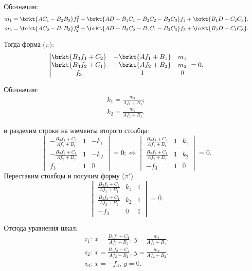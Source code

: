 Обозначим:
\begin{eqnarray}
m_1 = \brkt{A C_1 - B_2 B_3} f_1^2 
	+ \brkt{A D + B_1 C_1 - B_2 C_2 - B_3 C_3} f_1 
	+ \brkt{B_1 D - C_2 C_3}.\\
m_2 = \brkt{A C_2 - B_1 B_3}f_2^2 
	+ \brkt{A D + B_2 C_2 - B_1 C_1 - B_3 C_3} f_2
	+ \brkt{B_2 D - C_1 C_3}.
\end{eqnarray}

Тогда форма ($\pi$):
\begin{equation}
	\begin{vmatrix}
		\brkt{B_3 f_1 + C_2} &
		- \brkt{Af_1 + B_1} &
		m_1 \\
		\brkt{B_3 f_2 + C_1} &
		-\brkt{A f_2 + B_2} &
		m_2 \\
		f_3 & 1 & 0
	\end{vmatrix} = 0.
\end{equation}

Обозначим:
\begin{eqnarray}
	k_1 = \frac{m_1}{A f_1 + B_1};\\
	k_2 = \frac{m_2}{A f_2 + B_2}.
\end{eqnarray}

и разделим строки на элементы второго столбца:
$$
	\begin{vmatrix}
		- \frac{B_3 f_1 + C_2}{A f_1 + B_1} &
		1 &
		-k_1 \\
		-\frac{B_3 f_2 + C_1}{A f_2 + B_2} &
		1 &
		-k_2 \\
		f_3 & 1 & 0
	\end{vmatrix} = 0;
	\Leftrightarrow
	\begin{vmatrix}
		\frac{B_3 f_1 + C_2}{A f_1 + B_1} &
		1 &
		k_1 \\
		\frac{B_3 f_2 + C_1}{A f_2 + B_2} &
		1 &
		k_2 \\
		-f_3 & 1 & 0
	\end{vmatrix} = 0.
$$
Переставим столбцы и получим форму ($\pi'$)
\begin{equation}\label{pi'}
	\begin{vmatrix}
		\frac{B_3 f_1 + C_2}{A f_1 + B_1} & k_1 & 1 \\
		\frac{B_3 f_2 + C_1}{A f_2 + B_2} & k_2 & 1 \\
		-f_3 & 0 & 1
	\end{vmatrix} = 0.
\end{equation}

Отсюда уравнения шкал:
\begin{eqnarray}
	z_1:\: x = \frac{B_3 f_1 + C_2}{A f_1 + B_1},\, y = \frac{m_1}{A f_1 + B_1}.\label{z1t}\\
	z_2:\: x = \frac{B_3 f_2 + C_1}{A f_2 + B_2},\, y = \frac{m_2}{A f_2 + B_2}.\label{z2t}\\
	z_3:\: x = -f_3,\ y = 0.\label{z3t}
\end{eqnarray}


